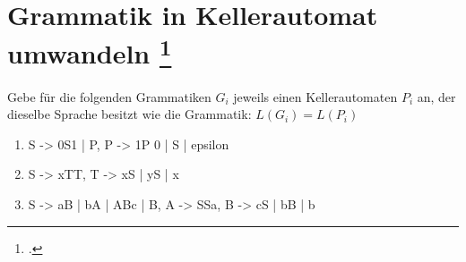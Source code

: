 \documentclass{lehramt-informatik-aufgabe}
\begin{document}
\section{Grammatik in Kellerautomat umwandeln
\footcite{theo:ab:2}}

Gebe für die folgenden Grammatiken $G_i$ jeweils einen Kellerautomaten
$P_i$ an, der dieselbe Sprache besitzt wie die Grammatik: $L(G_i) =
L(P_i)$

\begin{enumerate}


\item

\begin{liProduktionsRegeln}
S -> 0S1 | P,
P -> 1P 0 | S | epsilon
\end{liProduktionsRegeln}


\item

\begin{liProduktionsRegeln}
S -> xTT,
T -> xS | yS | x
\end{liProduktionsRegeln}


\item

\begin{liProduktionsRegeln}
S -> aB | bA | ABc | B,
A -> SSa,
B -> cS | bB | b
\end{liProduktionsRegeln}
\end{enumerate}
\end{document}
